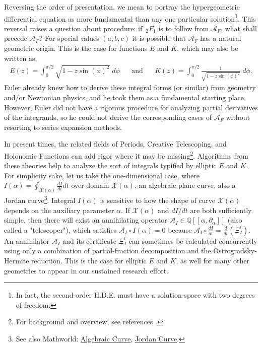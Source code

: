 \documentclass[nofootinbib,preprint]{revtex4-1}
\begin{document}
Reversing the order of presentation, we mean to portray the hypergeometric 
differential equation as more fundamental than any one particular 
solution\footnote{In fact, the second-order H.D.E. must 
have a solution-space with two degrees of freedom.}. This reversal raises 
a question about procedure: if $\,_2F_1$ is to follow from $\mathcal{A}_F$, 
what shall precede $\mathcal{A}_F$? For special values $(a,b,c)$ it is 
possible that $\mathcal{A}_F$ has a natural geometric origin\cite{KZ2001}. 
This is the case for functions $E$ and $K$, which may also be written as,
\begin{eqnarray}
 E(z) = \int_0^{\pi/2} \sqrt{1-z \sin(\phi)^2} \; d\phi
\;\;\;\;\;\; \text{and} \;\;\;\;\;\;
 K(z) =  \int_0^{\pi/2} \frac{1}{\sqrt{1-z \sin(\phi)^2}} \; d\phi.  \nonumber   
\end{eqnarray}
Euler already knew how to derive these integral forms (or similar)
from geometry and/or Newtonian physics, and he took them as a fundamental starting place. 
However, Euler did not have a rigorous procedure for analyzing partial 
derivatives of the integrands, so he could not derive the corresponding 
cases of $\mathcal{A}_F$ without resorting to series expansion methods.

In present times, the related fields of Periods, Creative Telescoping, and Holonomic Functions 
can add rigor where it may be missing\footnote{For background and overview, see references \cite{STANLEY1980,AZ1990,KZ2001,KP2011,KOUTSCHAN2013,BOSTAN2017}.}. 
Algorithms from these theories help to analyze the sort of integrals typified by 
elliptic $E$ and $K$. For simplicity sake, let us 
take the one-dimensional case, where  $I(\alpha)=\oint_{\mathcal{X}(\alpha)}\frac{dI}{dt}dt$
over domain $\mathcal{X}(\alpha)$, an algebraic plane curve, also a Jordan curve\footnote{See 
also Mathworld:
\href{https://mathworld.wolfram.com/AlgebraicCurve.html}{Algebraic Curve},
\href{https://mathworld.wolfram.com/JordanCurve.html}{Jordan Curve}.}. Integral $I(\alpha)$ is sensitive 
to how the shape of curve $\mathcal{X}(\alpha)$ depends on the auxiliary parameter $\alpha$.
If $\mathcal{X}(\alpha)$ and $dI/dt$ are both sufficiently simple, then there will exist 
an annihilating operator $\mathcal{A}_I \in \mathbb{Q}[\![\alpha, \partial_{\alpha}]\!]$ 
(also called a "telescoper"), which satisfies $\mathcal{A}_I \circ I(\alpha)=0$
because  $\mathcal{A}_I \circ \frac{dI}{dt} = \frac{d}{dt}(\Xi^{t}_I)$. An annihilator 
$\mathcal{A}_I$ and its certificate $\Xi^t_{I}$ can sometimes be calculated 
concurrently using only a combination of partial-fraction decomposition and the 
Ostrogradsky-Hermite reduction. This is the case for elliptic $E$ and $K$, as 
well for many other geometries to appear in our sustained research effort.
\end{document}

